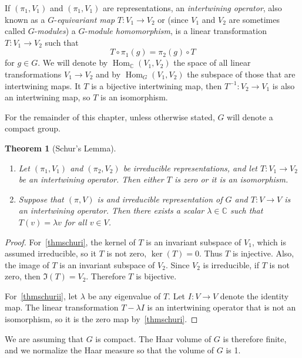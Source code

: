 \documentclass[12pt,reqno]{book}%
\newtheorem{theorem}{Theorem}[chapter]
\theoremstyle{definition}
\theoremstyle{remark}
\theoremstyle{theorem}
\theoremstyle{remark}
\DeclareMathOperator{\Hom}{Hom}
\begin{document}
If $(\pi_1, V_1)$ and $(\pi_1, V_1)$ are representations, an \emph{intertwining operator}, also known as a $G$-\emph{equivariant map} $T : V_1 \to V_2$ or (since $V_1$ and $V_2$ are sometimes called $G$-\emph{modules}) a $G$-\emph{module homomorphism}, is a linear transformation $T : V_1 \to V_2$ such that
\[
    T \circ \pi_1(g) = \pi_2(g) \circ T
\]
for $g \in G$.
We will denote by $\Hom_{\mathbb{C}}(V_1, V_2)$ the space of all linear transformations $V_1 \to V_2$ and by $\Hom_{G}(V_1, V_2)$ the subspace of those that are intertwining maps.
It $T$ is a bijective intertwining map, then $T^{-1} : V_2 \to V_1$ is also an intertwining map, so $T$ is an isomorphism.

For the remainder of this chapter, unless otherwise stated, $G$ will denote a compact group.

\begin{theorem}[Schur's Lemma]\label{thmschurslem}%
    \begin{enumerate}[label= (\roman*),font=\normalfont,before=\normalfont]
        \item Let $(\pi_1, V_1)$ and $(\pi_2, V_2)$ be irreducible representations, and let $T : V_1 \to V_2$ be an intertwining operator.
            Then either $T$ is zero or it is an isomorphism.\label{thmschuri}
        \item Suppose that $(\pi, V)$ is and irreducible representation of $G$ and $T : V \to V$ is an intertwining operator.
            Then there exists a scalar $\lambda \in \mathbb{C}$ such that $T(v) = \lambda v$ for all $v \in V$.\label{thmschurii}
    \end{enumerate}
\end{theorem}%
\begin{proof}%
    For~\ref{thmschuri}, the kernel of $T$ is an invariant subspace of $V_1$, which is assumed irreducible, so it $T$ is not zero, $\ker(T) = 0$.
    Thus $T$ is injective.
    Also, the image of $T$ is an invariant subspace of $V_2$.
    Since $V_2$ is irreducible, if $T$ is not zero, then $\Im(T) = V_2$.
    Therefore $T$ is bijective.

    For~\ref{thmschurii}, let $\lambda$ be any eigenvalue of $T$.
    Let $I : V \to V$ denote the identity map.
    The linear transformation $T - \lambda I$ is an intertwining operator that is not an isomorphism, so it is the zero map by~\ref{thmschuri}.
\end{proof}%

We are assuming that $G$ is compact.
The Haar volume of $G$ is therefore finite, and we normalize the Haar measure so that the volume of $G$ is 1.
\end{document}
